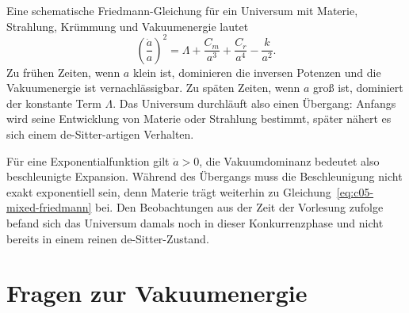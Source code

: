 Eine schematische Friedmann-Gleichung für ein Universum mit Materie, Strahlung, Krümmung und Vakuumenergie lautet
\begin{equation}
\left(\frac{\dot a}{a}\right)^2
=
\Lambda+\frac{C_m}{a^3}+\frac{C_r}{a^4}-\frac{k}{a^2}.
\label{eq:c05-mixed-friedmann}
\end{equation}
Zu frühen Zeiten, wenn \(a\) klein ist, dominieren die inversen Potenzen und die Vakuumenergie ist vernachlässigbar. Zu späten Zeiten, wenn \(a\) groß ist, dominiert der konstante Term \(\Lambda\). Das Universum durchläuft also einen Übergang: Anfangs wird seine Entwicklung von Materie oder Strahlung bestimmt, später nähert es sich einem de-Sitter-artigen Verhalten.

Für eine Exponentialfunktion gilt \(\ddot a>0\), die Vakuumdominanz bedeutet also beschleunigte Expansion. Während des Übergangs muss die Beschleunigung nicht exakt exponentiell sein, denn Materie trägt weiterhin zu Gleichung~\eqref{eq:c05-mixed-friedmann} bei. Den Beobachtungen aus der Zeit der Vorlesung zufolge befand sich das Universum damals noch in dieser Konkurrenzphase und nicht bereits in einem reinen de-Sitter-Zustand.

\section{Fragen zur Vakuumenergie}

\begin{classroomqa}
\end{classroomqa}

\begin{classroomqa}
\end{classroomqa}

